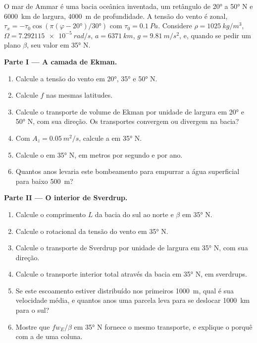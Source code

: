 \begin{problem}
\label{pb:b3:ocean-dynamics:1}
O mar de Ammar é uma bacia oceânica inventada, um retângulo de \ang{20} a
\ang{50} N e \qty{6000}{km} de largura, \qty{4000}{m} de profundidade. A tensão do vento é
zonal, $\tau_x = -\tau_0\cos(\pi(\varphi - \ang{20})/\ang{30})$ com $\tau_0
= \qty{0.1}{Pa}$. Considere $\rho = \qty{1025}{kg/m^3}$, $\Omega =
\qty{7.292115e-5}{rad/s}$, $a = \qty{6371}{km}$, $g = \qty{9.81}{m/s^2}$,
e, quando se pedir um plano $\beta$, seu valor em \ang{35} N.

\medskip\noindent\textbf{Parte I --- A camada de Ekman.}
\begin{enumerate}
\item Calcule a tensão do vento em \ang{20}, \ang{35} e \ang{50} N.
\item Calcule $f$ nas mesmas latitudes.
\item Calcule o transporte de volume de Ekman por unidade de largura em \ang{20} e
  \ang{50} N, com sua direção. Os transportes convergem ou divergem na
  bacia?
\item Com $A_z = \qty{0.05}{m^2/s}$, calcule a  em \ang{35} N.
\item Calcule o  em \ang{35} N, em metros por segundo e por
  ano.
\item Quantos anos levaria este bombeamento para empurrar a água superficial
  para baixo \qty{500}{m}?
\end{enumerate}

\medskip\noindent\textbf{Parte II --- O interior de Sverdrup.}
\begin{enumerate}[resume]
\item Calcule o comprimento $L$ da bacia do sul ao norte e $\beta$ em
  \ang{35} N.
\item Calcule o rotacional da tensão do vento em \ang{35} N.
\item Calcule o transporte de Sverdrup por unidade de largura em \ang{35} N, com sua
  direção.
\item Calcule o transporte interior total através da bacia em \ang{35} N,
  em sverdrups.
\item Se este escoamento estiver distribuído nos primeiros \qty{1000}{m}, qual é sua
  velocidade média, e quantos anos uma parcela leva para se deslocar \qty{1000}{km}
  para o sul?
\item Mostre que $fw_E/\beta$ em \ang{35} N fornece o mesmo transporte, e
  explique o porquê com a  de uma coluna.
\end{enumerate}


\end{problem}
